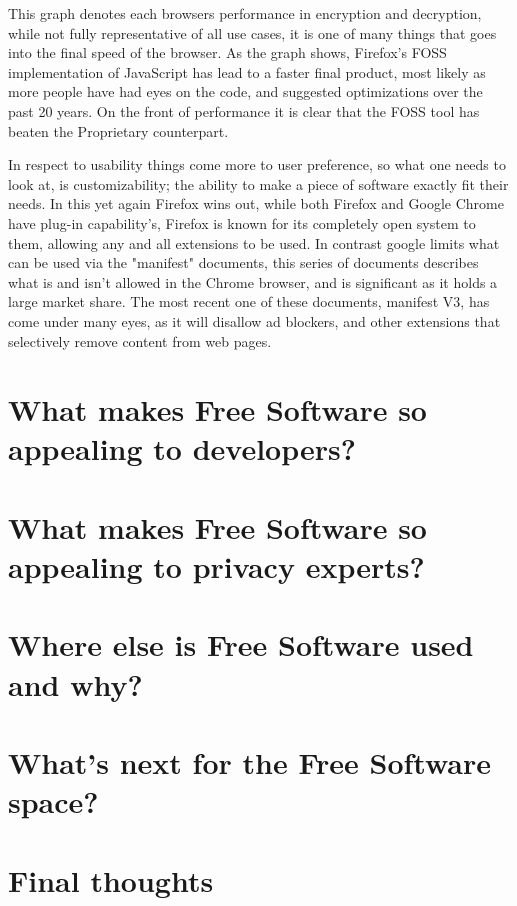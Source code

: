 \documentclass[a4paper,12pt]{article}
\begin{document}
{This graph denotes each browsers performance in encryption and decryption, while not fully representative of all use 
cases, it is one of many things that goes into the final speed of the browser. As the graph shows, Firefox's FOSS 
implementation of JavaScript has lead to a faster final product, most likely as more people have had eyes on the code, 
and suggested optimizations over the past 20 years. On the front of performance it is clear that the FOSS tool has beaten 
the Proprietary counterpart.

In respect to usability things come more to user preference, so what one needs to look at, is customizability; the ability 
to make a piece of software exactly fit their needs. In this yet again Firefox wins out, while both Firefox and Google Chrome 
have plug-in capability's, Firefox is known for its completely open system to them, allowing any and all extensions to be
used. In contrast google limits what can be used via the "manifest" documents, this series of documents describes what is
and isn't allowed in the Chrome browser, and is significant as it holds a large market share. The most recent one of these
documents, manifest V3\cite{MANIFESTv3}, has come under many eyes, as it will disallow ad blockers, and other extensions that selectively
remove content from web pages.

\section{What makes Free Software so appealing to developers?}
\section{What makes Free Software so appealing to privacy experts?}
\section{Where else is Free Software used and why?}
\section{What's next for the Free Software space?}
\section{Final thoughts}

\newpage
\printbibliography
}
\end{document}
